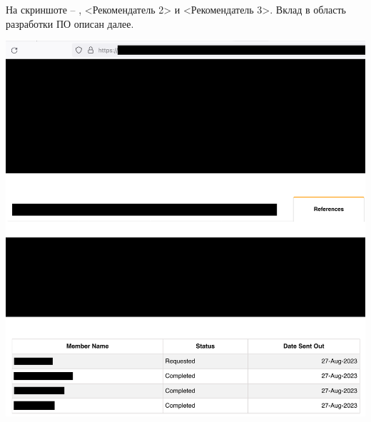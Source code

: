 
На скриншоте -- \MrIeeeReferenceOne, <Рекомендатель 2> и <Рекомендатель 3>.
Вклад \MrIeeeReferenceOne в область разработки ПО описан далее.

\begin{center}
    \includegraphics[width=\textwidth]{references_public}
\end{center}

\pagebreak
